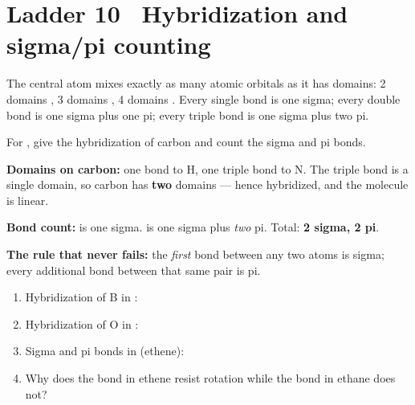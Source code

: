 \documentclass{apchem-worksheet}
\begin{document}
\section*{\sffamily Ladder 10 \textbullet\ Hybridization and sigma/pi counting}

The central atom mixes exactly as many atomic orbitals as it has domains:
2 domains , 3 domains , 4 domains . Every single
bond is one sigma; every double bond is one sigma plus one pi; every
triple bond is one sigma plus two pi.

\begin{workedexample}
For , give the hybridization of carbon and count the sigma and pi
bonds.

\textbf{Domains on carbon:} one bond to H, one triple bond to N. The
triple bond is a single domain, so carbon has \textbf{two} domains ---
hence  hybridized, and the molecule is linear.

\textbf{Bond count:}  is one sigma.  is one sigma plus
\emph{two} pi. Total: \textbf{2 sigma, 2 pi}.

\textbf{The rule that never fails:} the \emph{first} bond between any two
atoms is sigma; every additional bond between that same pair is pi.
\end{workedexample}

\begin{yourturn}
\begin{enumerate}[leftmargin=*,itemsep=0.5em]
  \item Hybridization of B in : \workspace[1.4cm]
  \item Hybridization of O in : \workspace[1.4cm]
  \item Sigma and pi bonds in  (ethene): \workspace[1.6cm]
  \item Why does the  bond in ethene resist rotation while the
         bond in ethane does not? \workspace[2.2cm]
\end{enumerate}
\end{yourturn}
\end{document}
